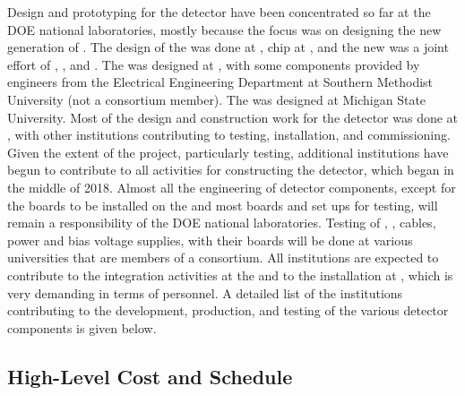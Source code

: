 Design and prototyping for the   detector have been 
concentrated so far at the DOE national laboratories, mostly because the 
focus was on designing the new generation of . The design 
of the   was done at ,  
chip at , and the new  was a joint effort of 
, , and . The  
 was designed at , with some components 
provided by engineers from the Electrical Engineering Department
at Southern Methodist University (not a consortium member).
The  was designed at Michigan State University.
Most of the design and construction work for the  detector 
was done at , with other institutions contributing to 
testing, installation, and commissioning. Given the extent of the project, 
particularly testing, additional institutions have begun to contribute
to all activities for constructing the  detector, which began 
in the middle of 2018. Almost all the engineering of detector components, 
except for the boards to be installed on the  and most boards 
and set ups for testing, will remain a responsibility
of the DOE national laboratories. Testing of 
, , cables, power and bias voltage supplies,
 with their boards will be done at various
universities that are members of a consortium. All institutions
are expected to contribute to the integration activities at
the  and to the installation at , which is very
demanding in terms of personnel. A detailed list of the 
institutions contributing to the development, production, and
testing of the various detector components is given below.

\subsection{High-Level Cost and Schedule}
\label{sec:fdsp-tpcelec-management-cost}


